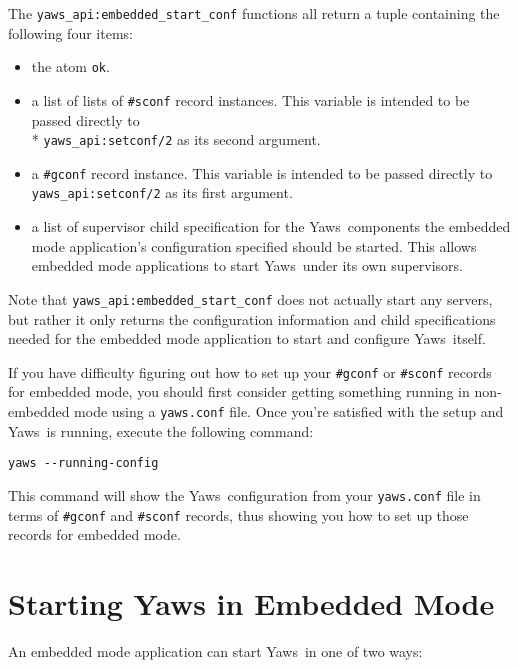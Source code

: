 \documentclass[11pt,oneside,english]{book}
\newcommand{\Yaws}            %
        {{\sc Yaws}}
\begin{document}
The \verb+yaws_api:embedded_start_conf+ functions all return a tuple
containing the following four items:

\begin{itemize}

\item the atom \verb+ok+.

\item a list of lists of \verb+#sconf+ record instances. This variable
  is intended to be passed directly to\\* \verb+yaws_api:setconf/2+ as
  its second argument.

\item a \verb+#gconf+ record instance. This variable is intended to
  be passed directly to \verb+yaws_api:setconf/2+ as its first
  argument.

\item a list of supervisor child specification for the
  \Yaws\  components the embedded mode application's configuration
  specified should be started. This allows embedded mode applications
  to start \Yaws\  under its own supervisors.

\end{itemize}

Note that \verb+yaws_api:embedded_start_conf+ does not actually start
any servers, but rather it only returns the configuration information
and child specifications needed for the embedded mode application to
start and configure \Yaws\  itself.

If you have difficulty figuring out how to set up your \verb+#gconf+
or \verb+#sconf+ records for embedded mode, you should first consider
getting something running in non-embedded mode using a
\verb+yaws.conf+ file. Once you're satisfied with the setup and
\Yaws\  is running, execute the following command:

\begin{verbatim}
yaws --running-config
\end{verbatim}

This command will show the \Yaws\ configuration from your
\verb+yaws.conf+ file in terms of \verb+#gconf+ and \verb+#sconf+
records, thus showing you how to set up those records for embedded
mode.

\section{Starting Yaws in Embedded Mode}

An embedded mode application can start \Yaws\  in one of two ways:
\end{document}
